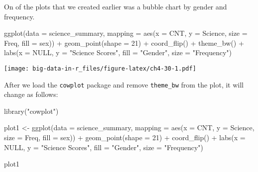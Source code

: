 \documentclass[
]{book}
\newenvironment{Shaded}{\begin{snugshade}}{\end{snugshade}}
\newcommand{\AttributeTok}[1]{\textcolor[rgb]{0.77,0.63,0.00}{#1}}
\newcommand{\ConstantTok}[1]{\textcolor[rgb]{0.00,0.00,0.00}{#1}}
\newcommand{\DecValTok}[1]{\textcolor[rgb]{0.00,0.00,0.81}{#1}}
\newcommand{\FunctionTok}[1]{\textcolor[rgb]{0.00,0.00,0.00}{#1}}
\newcommand{\NormalTok}[1]{#1}
\newcommand{\OtherTok}[1]{\textcolor[rgb]{0.56,0.35,0.01}{#1}}
\newcommand{\SpecialCharTok}[1]{\textcolor[rgb]{0.00,0.00,0.00}{#1}}
\newcommand{\StringTok}[1]{\textcolor[rgb]{0.31,0.60,0.02}{#1}}
\begin{document}
On of the plots that we created earlier was a bubble chart by gender and frequency.

\begin{Shaded}
\begin{Highlighting}[]
\FunctionTok{ggplot}\NormalTok{(}\AttributeTok{data =}\NormalTok{ science\_summary,}
       \AttributeTok{mapping =} \FunctionTok{aes}\NormalTok{(}\AttributeTok{x =}\NormalTok{ CNT, }\AttributeTok{y =}\NormalTok{ Science, }\AttributeTok{size =}\NormalTok{ Freq, }\AttributeTok{fill =}\NormalTok{ sex)) }\SpecialCharTok{+}
  \FunctionTok{geom\_point}\NormalTok{(}\AttributeTok{shape =} \DecValTok{21}\NormalTok{) }\SpecialCharTok{+}
  \FunctionTok{coord\_flip}\NormalTok{() }\SpecialCharTok{+}
  \FunctionTok{theme\_bw}\NormalTok{() }\SpecialCharTok{+} 
  \FunctionTok{labs}\NormalTok{(}\AttributeTok{x =} \ConstantTok{NULL}\NormalTok{, }\AttributeTok{y =} \StringTok{"Science Scores"}\NormalTok{, }\AttributeTok{fill =} \StringTok{"Gender"}\NormalTok{,}
       \AttributeTok{size =} \StringTok{"Frequency"}\NormalTok{)}
\end{Highlighting}
\end{Shaded}

\texttt{[image: big-data-in-r\_files/figure-latex/ch4-30-1.pdf]}

After we load the \texttt{cowplot} package and remove \texttt{theme\_bw} from the plot, it will change as follows:

\begin{Shaded}
\begin{Highlighting}[]
\FunctionTok{library}\NormalTok{(}\StringTok{"cowplot"}\NormalTok{)}

\NormalTok{plot1 }\OtherTok{\textless{}{-}}
  \FunctionTok{ggplot}\NormalTok{(}\AttributeTok{data =}\NormalTok{ science\_summary,}
         \AttributeTok{mapping =} \FunctionTok{aes}\NormalTok{(}\AttributeTok{x =}\NormalTok{ CNT, }\AttributeTok{y =}\NormalTok{ Science, }\AttributeTok{size =}\NormalTok{ Freq, }\AttributeTok{fill =}\NormalTok{ sex)) }\SpecialCharTok{+}
  \FunctionTok{geom\_point}\NormalTok{(}\AttributeTok{shape =} \DecValTok{21}\NormalTok{) }\SpecialCharTok{+}
  \FunctionTok{coord\_flip}\NormalTok{() }\SpecialCharTok{+}
  \FunctionTok{labs}\NormalTok{(}\AttributeTok{x =} \ConstantTok{NULL}\NormalTok{, }\AttributeTok{y =} \StringTok{"Science Scores"}\NormalTok{, }\AttributeTok{fill =} \StringTok{"Gender"}\NormalTok{,}
       \AttributeTok{size =} \StringTok{"Frequency"}\NormalTok{)}

\NormalTok{plot1}
\end{Highlighting}
\end{Shaded}
\end{document}
